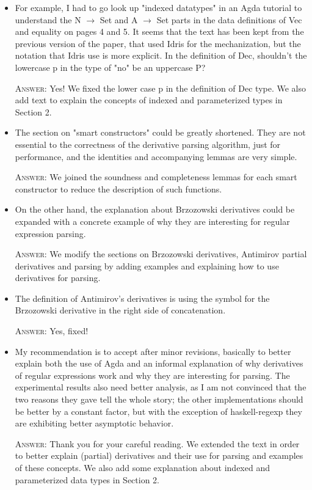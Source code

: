 \documentclass{article}
\begin{document}
\begin{itemize}
    
    \item For example, I had to go look up "indexed datatypes" in an Agda tutorial
    to understand the N $\to$ Set and A $\to$ Set parts in the data definitions of Vec
    and equality on pages 4 and 5. It seems that the text has been kept from
    the previous version of the paper, that used Idris for the mechanization,
    but the notation that Idris use is more explicit. In the definition of Dec,
    shouldn't the lowercase p in the type of "no" be an uppercase P?

    \textsc{Answer}: Yes! We fixed the lower case p in the definition of Dec type.
    We also add text to explain the concepts of indexed and parameterized types in
    Section 2.

    \item The section on "smart constructors" could be greatly shortened. They are
    not essential to the correctness of the derivative parsing algorithm,
    just for performance, and the identities and accompanying lemmas are
    very simple.

    \textsc{Answer}: We joined the soundness and completeness lemmas for each smart constructor to
    reduce the description of such functions.

    \item On the other hand, the explanation about Brzozowski derivatives could
    be expanded with a concrete example of why they are interesting for
    regular expression parsing.

    \textsc{Answer}: We modify the sections on Brzozowski derivatives, Antimirov partial derivatives 
    and parsing by adding examples and explaining how to use derivatives for parsing.

    \item The definition of Antimirov's derivatives is using the symbol for
    the Brzozowski derivative in the right side of concatenation.

    \textsc{Answer}: Yes, fixed!

    \item My recommendation is to accept after minor revisions, basically to
    better explain both the use of Agda and an informal explanation of why
    derivatives of regular expressions work and why they are interesting
    for parsing. The experimental results also need better analysis, as
    I am not convinced that the two reasons they gave tell the whole story;
    the other implementations should be better by a constant factor, but
    with the exception of haskell-regexp they are exhibiting better asymptotic
    behavior.

    \textsc{Answer}: Thank you for your careful reading. We extended the text in order
    to better explain (partial) derivatives and their use
    for parsing and examples of these concepts. We also add some explanation about
    indexed and parameterized data types in Section 2.
\end{itemize}    
\end{document}
